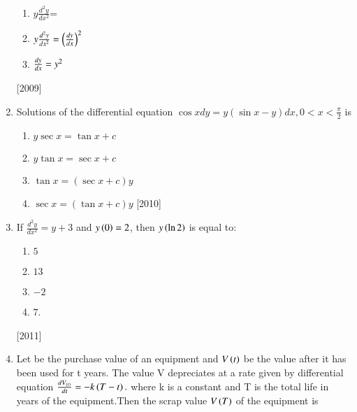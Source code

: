 \documentclass[journal]{IEEEtran}
\begin{document}
\begin{enumerate}
\begin{multicols}{2}
\begin{enumerate}
    \item $y\frac{d^{2}y}{dx^{2}}$= 

    \item $y\frac{d^{2}y}{dx^{2}}=\left(\frac{d{y}}{d{x}}\right)^2$
    
    \item $\frac{d{y}}{d{x}}=y^2$
 \end{enumerate}
\end{multicols}
\hfill
{[2009]}
\item Solutions of the differential equation $\cos{x} d{y}=y(\sin{x}-y)d{x},0<x<\frac{\pi}{2}$ is
\begin{multicols}{2}
 \begin{enumerate}
    
    \item $ y\sec{x}=\tan{x}+c$
    \item $y\tan{x}=\sec{x}+c$
    \item $\tan{x}=(\sec{x}+c)y$
    \item $\sec{x}=(\tan{x}+c)y$
\hfill
{{[2010]}}




    
 \end{enumerate}
\end{multicols}

\item If $\frac{d^{2}y}{dx^{2}}=y+3$ and $y\left(0\right)=2$, then $y\left(\ln{2}\right)$ is equal to:
\begin{multicols}{2}
 \begin{enumerate}
    \item $ 5 $
    \item $ 13 $
    \item $ -2 $
    \item $ 7 $.
 \end {enumerate}
\end{multicols}
\hfill
{{[2011]}}



\item Let  be the purchase value of an equipment and $V\left(t\right)$ be the value after it has been used for t years. The value V depreciates at a rate given by differential equation $\frac{d{V_{\left(t\right)}}}{d{t}}=-k\left(T-t\right).$ where k is a constant and T is the total life in years of the equipment.Then the scrap value $V\left(T\right)$ of the equipment is 
\begin{multicols}{2}
 \begin {enumerate}


\end{enumerate}
\end{multicols}
\end{enumerate}
\end{document}
